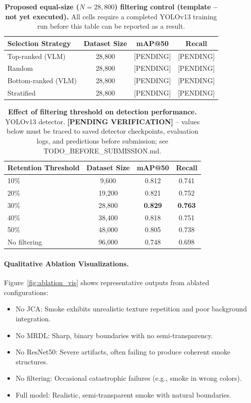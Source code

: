 \documentclass[journal]{IEEEtran}
\begin{document}
\begin{table}[t]
\centering
\caption{\textbf{Proposed equal-size ($N=28{,}800$) filtering control (template -- not yet executed).} All cells require a completed YOLOv13 training run before this table can be reported as a result.}
\label{tab:filter_equal_size}
\begin{tabular}{lccc}
\toprule
Selection Strategy & Dataset Size & mAP@50 & Recall \\
\midrule
Top-ranked (VLM) & 28,800 & [PENDING] & [PENDING] \\
Random & 28,800 & [PENDING] & [PENDING] \\
Bottom-ranked (VLM) & 28,800 & [PENDING] & [PENDING] \\
Stratified & 28,800 & [PENDING] & [PENDING] \\
\bottomrule
\end{tabular}
\end{table}

\begin{table}[t]
\centering
\caption{\textbf{Effect of filtering threshold on detection performance.} YOLOv13 detector. \textbf{[PENDING VERIFICATION]} -- values below must be traced to saved detector checkpoints, evaluation logs, and predictions before submission; see TODO\_BEFORE\_SUBMISSION.md.}
\label{tab:filter_threshold}
\begin{tabular}{lccc}
\toprule
Retention Threshold & Dataset Size & mAP@50 & Recall \\
\midrule
10\% & 9,600 & 0.812 & 0.741 \\
20\% & 19,200 & 0.821 & 0.752 \\
30\% & 28,800 & \textbf{0.829} & \textbf{0.763} \\
40\% & 38,400 & 0.818 & 0.751 \\
50\% & 48,000 & 0.805 & 0.738 \\
No filtering & 96,000 & 0.748 & 0.698 \\
\bottomrule
\end{tabular}
\end{table}

\FloatBarrier

\paragraph{Qualitative Ablation Visualizations.}
Figure~\ref{fig:ablation_vis} shows representative outputs from ablated configurations:
\begin{itemize}
    \item No JCA: Smoke exhibits unrealistic texture repetition and poor background integration.
    \item No MRDL: Sharp, binary boundaries with no semi-transparency.
    \item No ResNet50: Severe artifacts, often failing to produce coherent smoke structures.
    \item No filtering: Occasional catastrophic failures (e.g., smoke in wrong colors).
    \item Full model: Realistic, semi-transparent smoke with natural boundaries.
\end{itemize}
\end{document}
